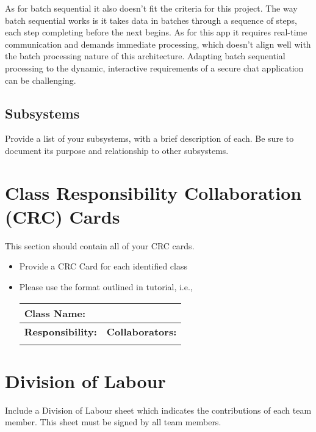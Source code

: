 \documentclass[]{article}
\begin{document}
As for batch sequential it also doesn’t fit the criteria for this project. The way batch sequential works is it takes data in batches through a sequence of steps, each step completing before the next begins. As for this app it requires real-time communication and demands immediate processing, which doesn’t align well with the batch processing nature of this architecture. Adapting batch sequential processing to the dynamic, interactive requirements of a secure chat application can be challenging.


\subsection{Subsystems}
\label{sub:subsystems}
 Provide a list of your subsystems, with a brief description of each. Be sure to document its purpose and relationship to other subsystems.


	
\section{Class Responsibility Collaboration (CRC) Cards}
\label{sec:class_responsibility_collaboration_crc_cards}
This section should contain all of your CRC cards.

\begin{itemize}
	\item Provide a CRC Card for each identified class
	\item Please use the format outlined in tutorial, i.e., 
	\begin{table}[ht]
		\centering
		\begin{tabular}{|p{5cm}|p{5cm}|}
		\hline 
		 \multicolumn{2}{|l|}{\textbf{Class Name:}} \\
		\hline
		\textbf{Responsibility:} & \textbf{Collaborators:} \\
		\hline
		\vspace{1in} & \\
		\hline
		\end{tabular}
	\end{table}
	
\end{itemize}

\appendix
\section{Division of Labour}
\label{sec:division_of_labour}
Include a Division of Labour sheet which indicates the contributions of each team member. This sheet must be signed by all team members.
\end{document}
